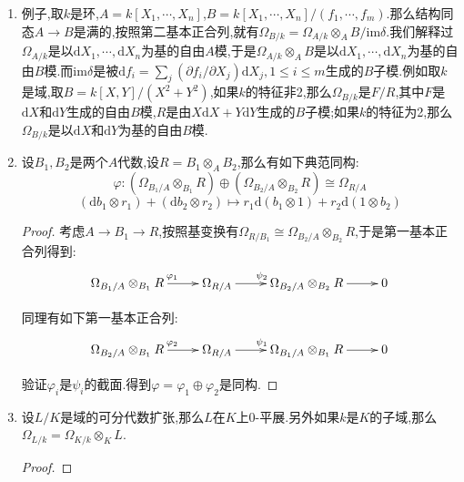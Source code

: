 \begin{enumerate}
\begin{proof}
    	根据第二基本正合列直接得证.单射也可以直接证:归结为证明对偶映射$\delta^*:\mathrm{Hom}_k(\Omega_{A/k}\otimes_AA/\mathfrak{m},k)\to\mathrm{Hom}_k(\mathfrak{m}/\mathfrak{m}^2,k)$是满射.也即$\mathrm{Der}_k(A,k)\to\mathrm{Hom}_k(\mathfrak{m}/\mathfrak{m}^2,k)$是满射.设$\varphi:\mathfrak{m}/\mathfrak{m}^2\to k$是$k$线性变换,任取$x\in A$,它可以唯一的分解为$x=x_1+x_2$,其中$x_1\in k$,$x_2\in\mathfrak{m}$,我们定义$D(x)=\varphi(x_2)$,那么$D:B\to k$是一个$k$导数,并且满足$\delta^*(D)=\varphi$.
    \end{proof}
	\item 例子,取$k$是环,$A=k[X_1,\cdots,X_n]$,$B=k[X_1,\cdots,X_n]/(f_1,\cdots,f_m)$.那么结构同态$A\to B$是满的,按照第二基本正合列,就有$\Omega_{B/k}=\Omega_{A/k}\otimes_AB/\mathrm{im}\delta$.我们解释过$\Omega_{A/k}$是以$\mathrm{d}X_1,\cdots,\mathrm{d}X_n$为基的自由$A$模,于是$\Omega_{A/k}\otimes_AB$是以$\mathrm{d}X_1,\cdots,\mathrm{d}X_n$为基的自由$B$模.而$\mathrm{im}\delta$是被$\mathrm{d}f_i=\sum_j(\partial f_i/\partial X_j)\mathrm{d}X_j,1\le i\le m$生成的$B$子模.例如取$k$是域,取$B=k[X,Y]/(X^2+Y^2)$,如果$k$的特征非2,那么$\Omega_{B/k}$是$F/R$,其中$F$是$\mathrm{d}X$和$\mathrm{d}Y$生成的自由$B$模,$R$是由$X\mathrm{d}X+Y\mathrm{d}Y$生成的$B$子模;如果$k$的特征为2,那么$\Omega_{B/k}$是以$\mathrm{d}X$和$\mathrm{d}Y$为基的自由$B$模.
	\item 设$B_1,B_2$是两个$A$代数,设$R=B_1\otimes_AB_2$,那么有如下典范同构:
	$$\varphi:(\Omega_{B_1/A}\otimes_{B_1}R)\oplus(\Omega_{B_2/A}\otimes_{B_2}R)\cong\Omega_{R/A}$$
	$$(\mathrm{d}b_1\otimes r_1)+(\mathrm{d}b_2\otimes r_2)\mapsto r_1\mathrm{d}(b_1\otimes1)+r_2\mathrm{d}(1\otimes b_2)$$
	\begin{proof}
		
		考虑$A\to B_1\to R$,按照基变换有$\Omega_{R/B_1}\cong\Omega_{B_2/A}\otimes_{B_2}R$,于是第一基本正合列得到:
		$$\xymatrix{\Omega_{B_1/A}\otimes_{B_1}R\ar[r]^{\varphi_1}&\Omega_{R/A}\ar[r]^{\psi_2}&\Omega_{B_2/A}\otimes_{B_2}R\ar[r]&0}$$
		
		同理有如下第一基本正合列:
		$$\xymatrix{\Omega_{B_2/A}\otimes_{B_1}R\ar[r]^{\varphi_2}&\Omega_{R/A}\ar[r]^{\psi_1}&\Omega_{B_1/A}\otimes_{B_1}R\ar[r]&0}$$
		
		验证$\varphi_i$是$\psi_i$的截面.得到$\varphi=\varphi_1\oplus\varphi_2$是同构.
	\end{proof}
	\item 设$L/K$是域的可分代数扩张,那么$L$在$K$上0-平展.另外如果$k$是$K$的子域,那么$\Omega_{L/k}=\Omega_{K/k}\otimes_KL$.
	\begin{proof}
		

\end{proof}
\end{enumerate}
